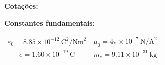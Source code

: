 \documentclass[11pt,a4paper,final,addpoints]{exam}
\begin{document}
\noindent\textbf{Cota\c{c}\~{o}es:}
\begin{center}
\gradetable[h][questions]
\linebreak
\end{center}

\noindent\textbf{Constantes fundamentais:}
\begin{center}
\begin{tabular}{cc}
$\varepsilon_0 = 8.85\times10^{-12}~\text{C}^2/\text{Nm}^2$ & $\mu_0 = 4\pi\times10^{-7}~\text{N}/\text{A}^2$ \\ 
$e=1.60\times10^{-19}~\text{C}$ & $m_e=9.11\times10^{-31}~\text{kg}$ \\ 
\end{tabular} 
\end{center}

\newpage
\fi

\begin{questions}


\newpage


%
%
%

\end{questions}
\end{document}
